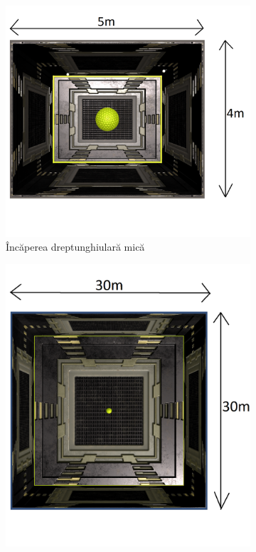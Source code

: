	\begin{figure}[!htb]%
		\begin{subfigure}[b]{.3\textwidth}
			\centering
			\includegraphics[width=1\linewidth]{imagini/smallRoom.png} 
			\caption{\^{I}nc\u{a}perea dreptunghiular\u{a} mic\u{a}}
		\end{subfigure}
		\hfill
		\begin{subfigure}[b]{.3\textwidth}
			\centering
			\includegraphics[width=1\linewidth]{imagini/bigRoom.png}

\end{subfigure}
\end{figure}
